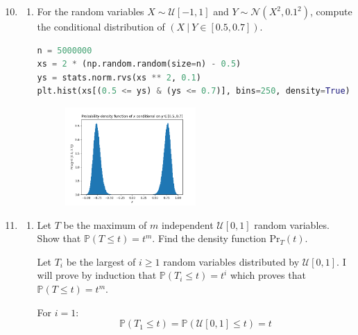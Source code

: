 \documentclass[10pt,\jkfside,a4paper]{article}
\begin{document}
\begin{enumerate}

\setcounter{enumi}{9}

\iffalse

\item 

\begin{enumerate}[label=(\alph*)]

\item For the random variables $X \sim \mathcal{U}[-1, 1]$ and
$Y \sim \mathcal{N}\left( X^2, 0.1^2 \right)$, compute the conditional
distribution of $\left(X \ | \ Y \in \left[ 0.5, 0.7 \right]\right)$.

\begin{lstlisting}[language=Python]
n = 5000000
xs = 2 * (np.random.random(size=n) - 0.5)
ys = stats.norm.rvs(xs ** 2, 0.1)
plt.hist(xs[(0.5 <= ys) & (ys <= 0.7)], bins=250, density=True)
\end{lstlisting}

\begin{figure}[H]
\centering
\includegraphics[width=0.5\textwidth]{./conditional_x_on_y_in_05_07}
\end{figure}

\end{enumerate}

\item

\begin{enumerate}[label=(\alph*)]

\item Let $T$ be the maximum of $m$ independent $\mathcal{U}[0, 1]$ random
variables. Show that $\mathbb{P}(T \leq t) = t^m$. Find the density function
$\text{Pr}_T(t)$.

Let $T_i$ be the largest of $i \geq 1$ random variables distributed by
$\mathcal{U}[0, 1]$. I will prove by induction that $\mathbb{P}(T_i \leq t) =
t^i$ which proves that $\mathbb{P}(T \leq t) = t^m$.

For $i=1$:
\[
\mathbb{P}(T_1 \leq t) = \mathbb{P}(\mathcal{U}[0, 1] \leq t) = t
\]


\end{enumerate}
\end{enumerate}
\end{document}
